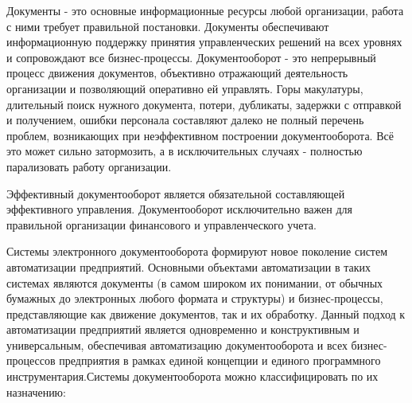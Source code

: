 \documentclass[14pt,a4paper]{reportmod}
\begin{document}
Документы - это основные информационные ресурсы любой организации, работа с ними требует правильной постановки. Документы обеспечивают информационную поддержку принятия управленческих решений на всех уровнях и сопровождают все бизнес-процессы. Документооборот - это непрерывный процесс движения документов, объективно отражающий деятельность организации и позволяющий оперативно ей управлять. Горы макулатуры, длительный поиск нужного документа, потери, дубликаты, задержки с отправкой и получением, ошибки персонала составляют далеко не полный перечень проблем, возникающих при неэффективном построении документооборота. Всё это может сильно затормозить, а в исключительных случаях - полностью парализовать работу организации\cite{refdoconline}.


Эффективный документооборот является обязательной составляющей эффективного управления. Документооборот исключительно важен для правильной организации финансового и управленческого учета.


Системы электронного документооборота формируют новое поколение систем автоматизации предприятий. Основными объектами автоматизации в таких системах являются документы (в самом широком их понимании, от обычных бумажных до электронных любого формата и структуры) и бизнес-процессы, представляющие как движение документов, так и их обработку. Данный подход к автоматизации предприятий является одновременно и конструктивным и универсальным, обеспечивая автоматизацию документооборота и всех бизнес-процессов предприятия в рамках единой концепции и единого программного инструментария.Системы документооборота можно классифицировать по их назначению:
\begin{gostitemize}
\end{gostitemize}
\end{document}
